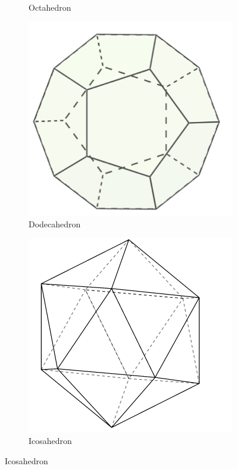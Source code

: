 \begin{figure} [hbt!]
\begin{subfigure}[b]{.45\linewidth}
                \caption*{Octahedron}
            \end{subfigure}
            \begin{subfigure}[b]{.45\linewidth}
                \includegraphics[scale=0.25]{Resources/Unit6Solids/dodecahedron.PNG}
                \caption*{Dodecahedron}
            \end{subfigure}
            \begin{subfigure}[b]{.45\linewidth}
                \includegraphics[scale=0.4]{Resources/Unit6Solids/icosahedron.PNG}
                \caption*{Icosahedron}
            \end{subfigure}
        \end{figure}

